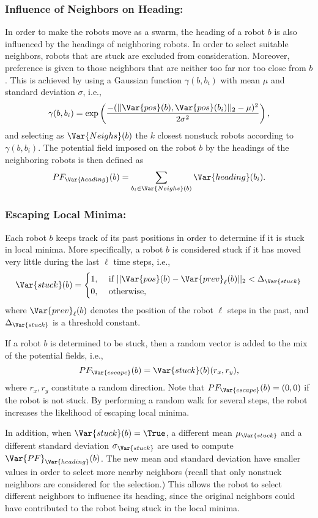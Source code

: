 \subsubsection{Influence of Neighbors on Heading:}
\label{sec:PFheading}
 In order to make
the robots move as a swarm, the heading of a robot $b$ is also
influenced by the headings of neighboring robots. In order to select
suitable neighbors, robots that are stuck
are excluded from consideration. Moreover, preference is given to those
neighbors that are neither too far nor too close from $b$. This is
achieved by using a Gaussian function $\gamma(b, b_i)$ with mean $\mu$ and standard
deviation $\sigma$, i.e.,
$$
\gamma(b, b_i) = \exp\left(\frac{-(||\Var{pos}(b), \Var{pos}(b_i)||_2 - \mu)^2}
{2\sigma^2}\right),
$$
and selecting as $\Var{Neighs}(b)$ the $k$ closest nonstuck robots
according to $\gamma(b, b_i)$.
The potential
field imposed on the robot $b$ by the headings of the neighboring robots
is then defined as
$$
PF_\Var{heading}(b) = \sum_{b_i \in
    \Var{Neighs}(b)} \Var{heading}(b_i).
$$




\subsubsection{Escaping Local Minima:}
\label{sec:PFrand}
Each robot $b$ keeps track of its past positions in order to determine
if it is stuck in local minima. More specifically, a robot $b$ is
considered stuck if it has moved very little during the last $\ell$
time steps, i.e.,
$$
\Var{stuck}(b) = 
\begin{cases}
1, & \mbox{ if } ||\Var{pos}(b) - \Var{prev}_{\ell}(b)||_2 <
\Delta_\Var{stuck}\\
0, & \mbox{ otherwise,}
\end{cases}
$$
 where $\Var{prev}_{\ell}(b)$ denotes the position of the robot 
 $\ell$ steps in the past,  and $\Delta_\Var{stuck}$ is a
 threshold constant.

If a robot $b$ is determined to be stuck, then a random vector is added
to the mix of the potential fields, i.e.,
$$
PF_\Var{escape}(b) = \Var{stuck}(b) (r_x, r_y),
$$
where $r_x, r_y$ constitute a random direction. Note that
$PF_\Var{escape}(b) = (0, 0)$ if the robot is not stuck. By performing a random walk for
several steps, the robot increases the likelihood of escaping local
minima.

In addition, when $\Var{stuck}(b) = \True$, a different mean
$\mu_\Var{stuck}$ and a different standard deviation
$\sigma_\Var{stuck}$ are used to compute
$\Var{PF}_\Var{heading}(b)$. The new mean and standard deviation have
smaller values in order to select more nearby neighbors (recall that
only nonstuck neighbors are considered for the selection.)  This
allows the robot to select different neighbors to influence its
heading, since the original neighbors could have contributed to the robot being
stuck in the local minima.

